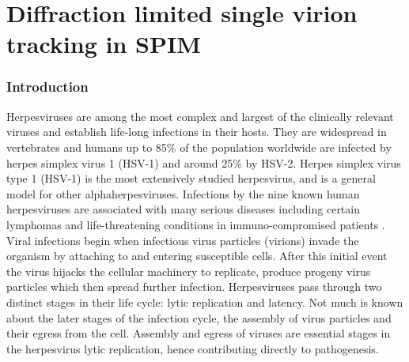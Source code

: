 \ifpdf
    \graphicspath{{Chapters/spt/Figs/Raster/}{Chapters/spt/Figs/PDF/}{Chapters/spt/Figs/}}
\else
    \graphicspath{{Chapters/spt/Figs/Vector/}{Chapters/spt/Figs/}}
\fi

\chapter{Diffraction limited single virion tracking in SPIM}

\subsection{Introduction}
Herpesviruses are among the most complex and largest of the clinically relevant viruses and establish life-long infections in their hosts.
They are widespread in vertebrates and humans up to 85\% of the population worldwide are infected by herpes simplex virus 1 (HSV-1) and around 25\% by HSV-2.
Herpes simplex virus type 1 (HSV-1) is the most extensively studied herpesvirus, and is a general model for other alphaherpesviruses.
Infections by the nine known human herpesviruses are associated with many serious diseases including certain lymphomas and life-threatening conditions in immuno-compromised patients \cite{[1]}.
Viral infections begin when infectious virus particles (virions) invade the organism by attaching to and entering susceptible cells.
After this initial event the virus hijacks the cellular machinery to replicate, produce progeny virus particles which then spread further infection.
Herpesviruses pass through two distinct stages in their life cycle: lytic replication and latency.
Not much is known about the later stages of the infection cycle, the assembly of virus particles and their egress from the cell.
Assembly and egress of viruses are essential stages in the herpesvirus lytic replication, hence contributing directly to pathogenesis.

